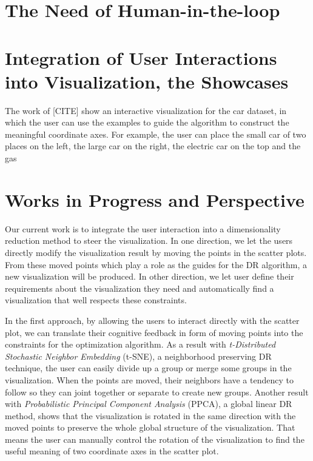 \section{The Need of Human-in-the-loop}





\section{Integration of User Interactions into Visualization, the Showcases}


The work of [CITE] show an interactive visualization for the car dataset, in which the user can use the examples to guide the algorithm to construct the meaningful coordinate axes.
For example, the user can place the small car of two places on the left, the large car on the right, the electric car on the top and the gas

\section{Works in Progress and Perspective}

Our current work is to integrate the user interaction into a dimensionality reduction method to steer the visualization.
In one direction, we let the users directly modify the visualization result by moving the points in the scatter plots.
From these moved points which play a role as the guides for the DR algorithm, a new visualization will be produced.
In other direction, we let user define their requirements about the visualization they need and automatically find a visualization that well respects these constraints.

In the first approach, by allowing the users to interact directly with the scatter plot, we can translate their cognitive feedback in form of moving points into the constraints for the optimization algorithm.
As a result with \emph{t-Distributed Stochastic Neighbor Embedding} (t-SNE), a neighborhood preserving DR technique, the user can easily divide up a group or merge some groups in the visualization.
When the points are moved, their neighbors have a tendency to follow so they can joint together or separate to create new groups.
Another result with \emph{Probabilistic Principal Component Analysis} (PPCA), a global linear DR method, shows that the visualization is rotated in the same direction with the moved points to preserve the whole global structure of the visualization. That means the user can manually control the rotation of the visualization to find the useful meaning of two coordinate axes in the scatter plot.

